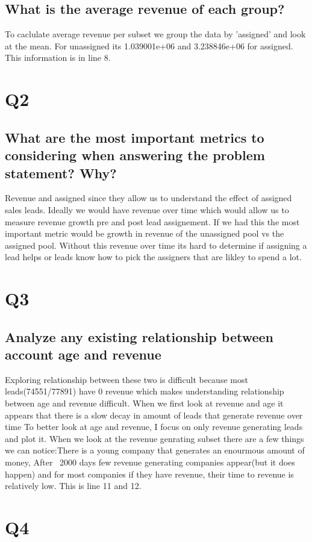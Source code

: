 \documentclass[11pt]{article}
\begin{document}
\subsection{What is the average revenue of each group?}
To caclulate average revenue per subset we group the data by 'assigned' and look at the mean. For unassigned its 1.039001e+06 and 3.238846e+06 for assigned. This information is in line 8.
\section{Q2}
\subsection{What are the most important metrics to considering when answering the problem statement? Why?}
Revenue and assigned since they allow us to understand the effect of assigned sales leads. Ideally we would have revenue over time which would allow us to measure revenue growth pre and post lead assignement. If we had this the most important metric would be growth in revenue of the unassigned pool vs the assigned pool. Without this revenue over time its hard to determine if assigning a lead helps or leads know how to pick the assigners that are likley to spend a lot.
\section{Q3}
\subsection{Analyze any existing relationship between account age and revenue}
Exploring relationship between these two is difficult because most leads(74551/77891) have 0 revenue which makes understanding relationship between age and revenue difficult. When we first look at revenue and age it appears that there is a slow decay in amount of leads that generate revenue over time To better look at age and revenue, I focus on only revenue generating leads and plot it. When we look at the revenue genrating subset there are a few things we can notice:There is a young company that generates an enourmous amount of money, After ~2000 days few revenue generating companies appear(but it does happen) and for most companies if they have revenue, their time to revenue is relatively low. This is line 11 and 12.
\section{Q4}
\end{document}
